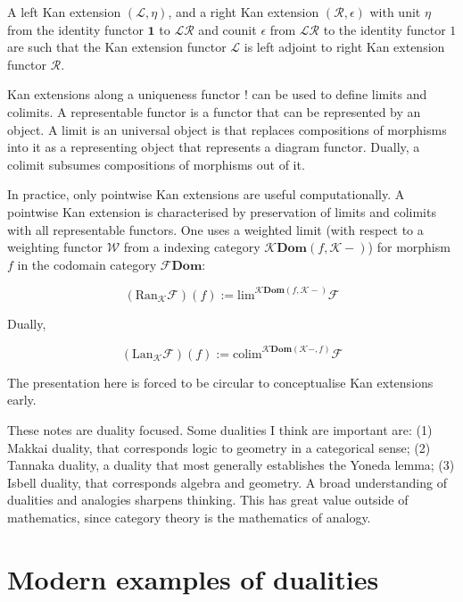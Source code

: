 \documentclass{tufte-book}
\begin{document}
 A left Kan extension $(\mathcal{L}, \eta)$, and a right Kan extension $(\mathcal{R}, \epsilon)$ with unit $\eta$ from the identity functor $\mathbf{1}$ to $\mathcal{L} \mathcal{R}$ and counit $\epsilon$ from $\mathcal{L} \mathcal{R}$ to the identity functor $\mathcal{1}$ are such that the Kan extension functor $\mathcal{L}$ is left adjoint to right Kan extension functor $\mathcal{R}$.
 
 Kan extensions along a uniqueness functor $\mathbf{!}$ can be used to define limits and colimits. A representable functor is a functor that can be represented by an object. A limit is an universal object is that replaces compositions of morphisms into it as a representing object that represents a diagram functor. Dually, a colimit subsumes compositions of morphisms out of it.
 
 In practice, only pointwise Kan extensions are useful computationally. A pointwise Kan extension is characterised by preservation of limits and colimits with all representable functors. One uses a weighted limit (with respect to a weighting functor $\mathcal{W}$ from a indexing category $\mathcal{K} \mathbf{Dom}(f, \mathcal{K}-)$) for morphism $f$ in the codomain category $\mathcal{F} \mathbf{Dom}$:
 
 \begin{equation}
     (\mathrm{Ran}_\mathcal{K} \mathcal{F})(f)
     :=
     \mathrm{lim}^{\mathcal{K} \mathbf{Dom}(f, \mathcal{K}-)} \mathcal{F}
 \end{equation}
 
 Dually,
 
 \begin{equation}
     (\mathrm{Lan}_\mathcal{K} \mathcal{F})(f)
     :=
     \mathrm{colim}^{\mathcal{K} \mathbf{Dom}(\mathcal{K}-, f)} \mathcal{F}
 \end{equation}
 
 The presentation here is forced to be circular to conceptualise Kan extensions early. 
 
 These notes are duality focused. Some dualities I think are important are: (1) Makkai duality, that corresponds logic to geometry in a categorical sense; (2) Tannaka duality, a duality that most generally establishes the Yoneda lemma; (3) Isbell duality, that corresponds algebra and geometry. A broad understanding of dualities and analogies sharpens thinking. This has great value outside of mathematics, since category theory is the mathematics of analogy.

 \section{Modern examples of dualities}
\end{document}
